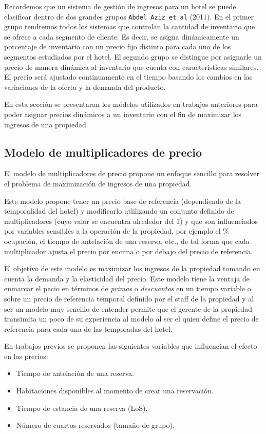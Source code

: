{Recordemos que un sistema de gestión de ingresos para un hotel se puede clasificar dentro de dos grandes grupos \texttt{Abdel Aziz et al} (2011). En el primer grupo tendremos todos los sistemas que controlan la cantidad de inventario que se ofrece a cada segmento de cliente. Es decir, se asigna dinámicamente un porcentaje de inventario con un precio fijo distinto para cada uno de los segmentos estudiados por el hotel. El segundo grupo se distingue por asignarle un precio de manera dinámica al inventario que cuenta con características similares. El precio será ajustado continuamente en el tiempo basando los cambios en las variaciones de la oferta y la demanda del producto.

En esta sección se presentaran los módelos utilizados en trabajos anteriores para poder asignar precios dinámicos a un inventario con el fin de maximizar los ingresos de una propiedad.

\subsection*{Modelo de multiplicadores de precio}

El modelo de multiplicadores de precio propone un enfoque sencillo para resolver el problema de maximización de ingresos de una propiedad.

Este modelo propone tener un precio base de referencia (dependiendo de la temporalidad del hotel) y modificarlo utlilizando un conjunto definido de multiplicadores (cuyo valor se encuentra alrededor del 1) y que son influenciados por variables sensibles a la operación de la propiedad, por ejemplo el \% ocupación, el tiempo de antelación de una reserva, etc., de tal forma que cada multiplicador ajusta el precio por encima o por debajo del precio de referencia. 

El objetivo de este modelo es maximizar los ingresos de la propiedad tomando en cuenta la demanda y la elasticidad del precio. Este modelo tiene la ventaja de enmarcar el pecio en términos de \emph{primas} o \emph{descuentos} en un tiempo variable o sobre un precio de referencia temporal definido por el staff de la propiedad y al ser un modelo muy sencillo de entender permite que el gerente de la propiedad transimita un poco de su experiencia al modelo al ser el quien define el precio de referencia para cada una de las temporadas del hotel.

En trabajos previos se proponen las siguientes variables que influencían el efecto en los precios:
\begin{itemize}
  \item Tiempo de antelación de una reserva.
  \item Habitaciones disponibles al momento de crear una reservación.
  \item Tiempo de estancia de una reserva (LoS).
  \item Número de cuartos reservados (tamaño de grupo).
\end{itemize}

}
